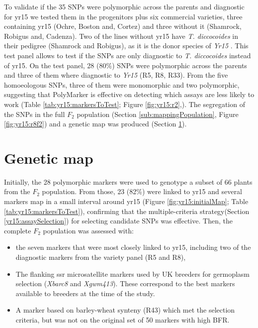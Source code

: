 To validate if the 35 SNPs were polymorphic across the parents and diagnostic for \acrshort{yr15} we tested them in the progenitors plus six commercial varieties, three containing \acrshort{yr15} (Ochre, Boston and, Cortez) and three without it (Shamrock, Robigus and, Cadenza).
Two of the lines without \acrshort{yr15} have \textit{T. diccocoides} in their pedigree (Shamrock and Robigus), as it is the donor species of \textit{Yr15} \citep{mcintosh1995}. 
This test panel allows to test if the SNPs are only diagnostic to \textit{T. diccocoides} instead of \acrshort{yr15}.
On the test panel, 28 ($80\%$) SNPs were polymorphic across the parents and three of them where diagnostic to \textit{Yr15} (R5, R8, R33).
From the five homoeologous SNPs, three of them were monomorphic and two polymorphic, suggesting that PolyMarker is effective on detecting which assays are less likely to work (Table \ref{tab:yr15:markersToTest}; Figure \ref{fig:yr15:r2},).
The segregation of the SNPs in the full $F_{2}$ population (Section \ref{sub:mappingPopulation}, Figure \ref{fig:yr15:r8f2}) and a genetic map was produced (Section \ref{yr15:geneticMap}).   






\section{Genetic map} 
\label{yr15:geneticMap}


Initially, the 28 polymorphic markers were used to genotype a subset of 66 plants from the $F_{2}$ population. 
From those, 23 (82\%) were linked to \acrshort{yr15} and several markers map in a small interval around \acrshort{yr15} (Figure \ref{fig:yr15:initialMap}; Table \ref{tab:yr15:markersToTest}), confirming that the multiple-criteria strategy(Section \ref{yr15:assaySelection}) for selecting candidate SNPs was effective. 
Then, the complete $F_{2}$ population was assessed with:
\begin{itemize}	
	\item  the seven markers that were most closely linked to \acrshort{yr15}, including two of the diagnostic markers from the variety panel (R5 and R8),
	\item The flanking \acrshort{ssr} microsatellite markers used by UK breeders for germoplasm selection (\textit{Xbarc8} and \textit{Xgwm413}).  These correspond to the best markers available to breeders at the time of the study.
	\item A marker based on barley-wheat synteny (R43) which met the selection criteria, but was not on the original set of 50 markers with high BFR. 
\end{itemize}

